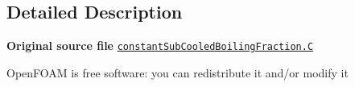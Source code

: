 \subsection{Detailed Description}
{\bfseries Original source file} \href{../../../home/carlo/data/GeN-Foam/GeN-Foam_ffn/GeN-Foam/GeN-Foam/classes/thermalHydraulics/src/physicsModels/heatTransferModels/FSHeatTransferCoefficientModels/subModels/subCooledBoilingFractionModels/constant/constantSubCooledBoilingFraction.C}{\tt constant\+Sub\+Cooled\+Boiling\+Fraction.\+C}

Open\+F\+O\+AM is free software\+: you can redistribute it and/or modify it 